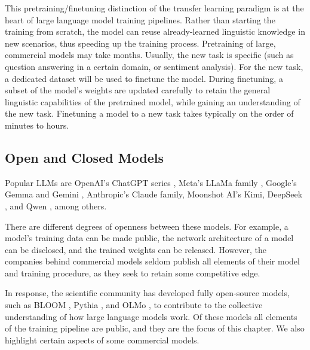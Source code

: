 
This pretraining/finetuning distinction of the transfer learning paradigm is at the heart of  large language model training pipelines. 
Rather than starting the training from scratch, the model can reuse already-learned linguistic knowledge in new scenarios, thus speeding up the training process. Pretraining of large, commercial models may take months.  Usually, the new task is specific (such as question answering in a certain domain, or sentiment analysis). For the new task, a dedicated dataset will be used to finetune the model. During finetuning, a subset of the model's weights are updated carefully to retain the general linguistic capabilities of the pretrained model, while gaining an understanding of the new task. Finetuning a model to a new task takes typically on the order of minutes to hours.


\subsection{Open and Closed Models} 
\label{sec:pipeline-models}
Popular LLMs are OpenAI's ChatGPT series \citep{achiam2023gpt,ouyang2022training}, Meta's LLaMa family \citep{touvron2023llama}, Google's Gemma \citep{chowdhery2023palm} and Gemini
\citep{team2023gemini}, Anthropic's Claude family, Moonshot AI's Kimi, DeepSeek \citep{guo2025deepseek}, and Qwen \citep{bai2025qwen2}, among others. 

There are different degrees of openness between these models. For example, a model's  training data can be made public, the network architecture of a model can be disclosed, and the trained  weights can be released.  However, the companies behind commercial models seldom publish all elements of their model and training procedure, as they seek to retain some competitive edge. 

In response, the scientific community has developed fully open-source models, such as BLOOM \citep{le2023bloom}, Pythia \citep{biderman2023pythia}, and OLMo \citep{groeneveld2024olmoacceleratingsciencelanguage}, to contribute to the collective understanding  of how large language models work. Of these models all elements of the training pipeline are public, and they are the focus of this chapter. We also highlight certain aspects of some  commercial models.


